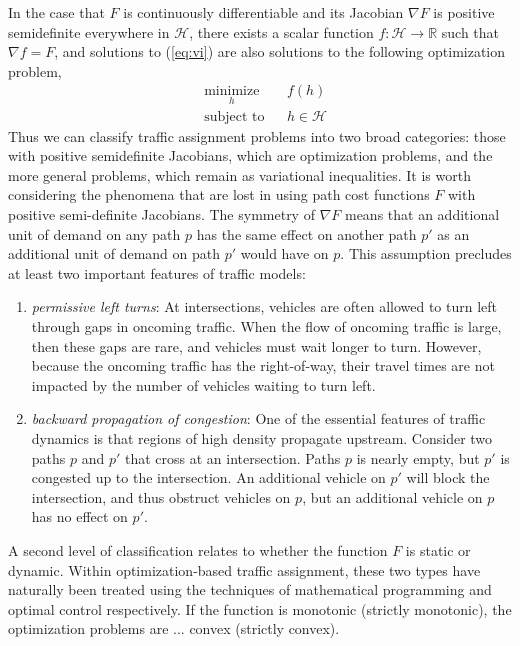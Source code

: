 In the case that $F$ is continuously differentiable and its Jacobian $\nabla F$ is positive semidefinite everywhere in $\mathcal{H}$, there exists a scalar function $f:\mathcal{H}\rightarrow \mathbb{R}$ such that $\nabla f = F$, and solutions to (\ref{eq:vi}) are also solutions to the following optimization problem,
\begin{equation}
\label{eq:opt}
\begin{aligned}
& \underset{h}{\text{minimize}}
& & f(h) \\
& \text{subject to}
& & h \in \mathcal{H}
\end{aligned}
\end{equation}
Thus we can classify traffic assignment problems into two broad categories: those with positive semidefinite Jacobians, which are optimization problems, and the more general problems, which remain as variational inequalities. It is worth considering the phenomena that are lost in using path cost functions $F$ with positive semi-definite Jacobians. The symmetry of $\nabla F$ means that an additional unit of demand on any path $p$ has the same effect on another path $p'$ as an additional unit of demand on path $p'$ would have on $p$. This assumption precludes at least two important features of traffic models:
\begin{enumerate}
\item \textit{permissive left turns}: At intersections, vehicles are often allowed to turn left through gaps in oncoming traffic. When the flow of oncoming traffic is large, then these gaps are rare, and vehicles must wait longer to turn. However, because the oncoming traffic has the right-of-way, their travel times are not impacted by the number of vehicles waiting to turn left. 
\item \textit{backward propagation of congestion}: One of the essential features of traffic dynamics is that regions of high density propagate upstream. Consider two paths $p$ and $p'$ that cross at an intersection. Paths $p$ is nearly empty, but $p'$ is congested up to the intersection. An additional vehicle on $p'$ will block the intersection, and thus obstruct vehicles on $p$, but an additional vehicle on $p$ has no effect on $p'$.
\end{enumerate}
A second level of classification relates to whether the function $F$ is static or dynamic. Within optimization-based traffic assignment, these two types have naturally been treated using the techniques of mathematical programming and optimal control respectively. If the function \XXX is monotonic (strictly monotonic), the optimization problems are ... convex (strictly convex).
